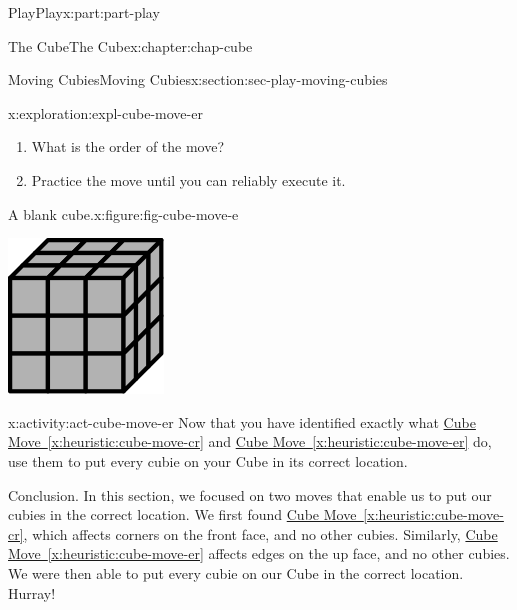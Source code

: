 \documentclass[oneside,10pt,]{book}
\newcommand{\xreffont}{\relax}
\numberwithin{equation}{section}
\begin{document}
\begin{partptx}{Play}{}{Play}{}{}{x:part:part-play}
\begin{chapterptx}{The Cube}{}{The Cube}{}{}{x:chapter:chap-cube}
\begin{sectionptx}{Moving Cubies}{}{Moving Cubies}{}{}{x:section:sec-play-moving-cubies}
\begin{exploration}{}{x:exploration:expl-cube-move-er}
\begin{enumerate}
\item{}What is the order of the move?%
\item{}Practice the move until you can reliably execute it.%
\end{enumerate}
\begin{figureptx}{A blank cube.}{x:figure:fig-cube-move-e}{}%
\begin{image}{0.25}{0.5}{0.25}%
\includegraphics[width=\linewidth]{./images/grey_cube.svg}
\end{image}%
\tcblower
\end{figureptx}%
\end{exploration}%
\begin{activity}{}{x:activity:act-cube-move-er}%
Now that you have identified exactly what \hyperref[x:heuristic:cube-move-cr]{Cube Move~{\xreffont\ref{x:heuristic:cube-move-cr}}} and \hyperref[x:heuristic:cube-move-er]{Cube Move~{\xreffont\ref{x:heuristic:cube-move-er}}} do, use them to put every cubie on your Cube in its correct location.%
\end{activity}%
\begin{conclusion}{Conclusion.}%
In this section, we focused on two moves that enable us to put our cubies in the correct location. We first found \hyperref[x:heuristic:cube-move-cr]{Cube Move~{\xreffont\ref{x:heuristic:cube-move-cr}}}, which affects corners on the front face, and no other cubies. Similarly, \hyperref[x:heuristic:cube-move-er]{Cube Move~{\xreffont\ref{x:heuristic:cube-move-er}}} affects edges on the up face, and no other cubies. We were then able to put every cubie on our Cube in the correct location. Hurray!%

\end{conclusion}
\end{sectionptx}
\end{chapterptx}
\end{partptx}
\end{document}
